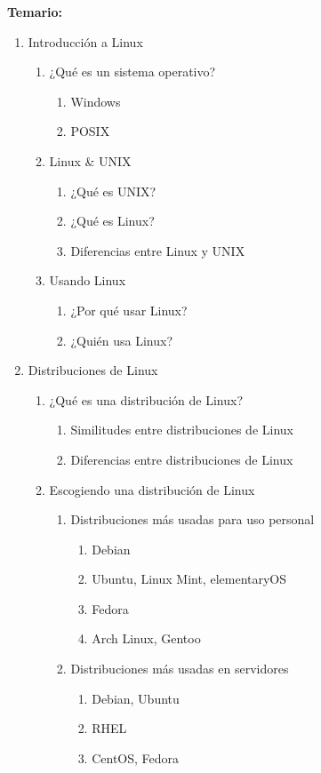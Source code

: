 \documentclass[12pt, letter-paper]{article}
\begin{document}
\textbf{Temario:}
\begin{enumerate}
\item Introducción a Linux
  \begin{enumerate}
  \item ¿Qué es un sistema operativo?
    \begin{enumerate}
    \item Windows
    \item POSIX
    \end{enumerate}
  \item Linux \& UNIX
    \begin{enumerate}
    \item ¿Qué es UNIX?
    \item ¿Qué es Linux?
    \item Diferencias entre Linux y UNIX
    \end{enumerate}
  \item Usando Linux
    \begin{enumerate}
    \item ¿Por qué usar Linux?
    \item ¿Quién usa Linux?
    \end{enumerate}
  \end{enumerate}
  
\item Distribuciones de Linux
  \begin{enumerate}
  \item ¿Qué es una distribución de Linux?
    \begin{enumerate}
    \item Similitudes entre distribuciones de Linux
    \item Diferencias entre distribuciones de Linux
    \end{enumerate}
  \item Escogiendo una distribución de Linux
    \begin{enumerate}
    \item Distribuciones más usadas para uso personal
      \begin{enumerate}
      \item Debian
      \item Ubuntu, Linux Mint, elementaryOS
      \item Fedora
      \item Arch Linux, Gentoo
      \end{enumerate}
    \item Distribuciones más usadas en servidores
      \begin{enumerate}
      \item Debian, Ubuntu
      \item RHEL
      \item CentOS, Fedora
      \end{enumerate}
    \end{enumerate}
  \end{enumerate}
  

\end{enumerate}
\end{document}

